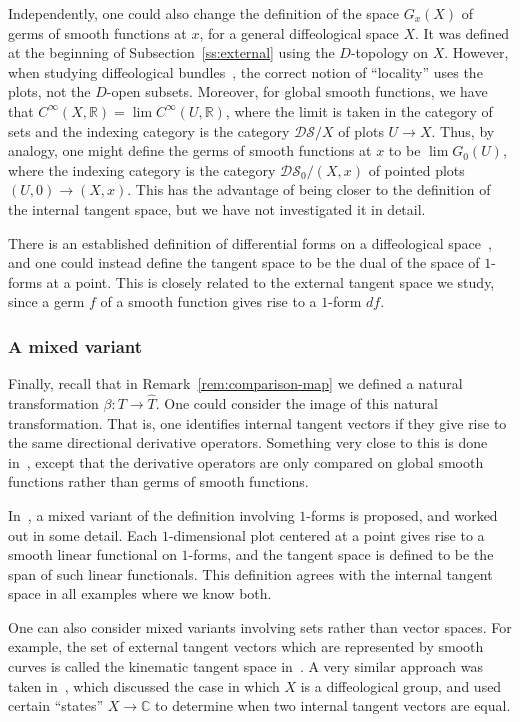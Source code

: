 \documentclass[12pt]{amsart}
\theoremstyle{remark}
\newcommand{\DS}{{\mathcal{DS}}}
\def \C{\mathbb{C}}
\def \R{\mathbb{R}}
\begin{document}
Independently, one could also change the definition of the space $G_x(X)$
of germs of smooth functions at $x$, for a general diffeological space $X$.
It was defined at the beginning of Subsection~\ref{ss:external} using the
$D$-topology on $X$.
However, when studying diffeological bundles~\cite{I1}, the correct notion
of ``locality'' uses the plots, not the $D$-open subsets.
Moreover, for global smooth functions, we have that
$C^{\infty}(X, \R) = \lim C^{\infty}(U, \R)$,
where the limit is taken in the category of sets and the indexing category
is the category $\DS/X$ of plots $U \to X$.
Thus, by analogy, one might define the germs of smooth functions at $x$ to be
$\lim G_0(U)$,
where the indexing category is the category $\DS_0/(X,x)$ of pointed plots
$(U,0) \to (X,x)$.
This has the advantage of being closer to the definition of the internal tangent
space, but we have not investigated it in detail.

There is an established definition of differential forms on a
diffeological space~\cite{I3}, and one could instead define the
tangent space to be the dual of the space of $1$-forms at a point.
This is closely related to the external tangent space we study,
since a germ $f$ of a smooth function gives rise to a $1$-form $df$.

\subsubsection{A mixed variant}

Finally, recall that in Remark~\ref{rem:comparison-map} we defined a
natural transformation $\beta : T \to \hat{T}$.
One could consider the image of this natural transformation.
That is, one identifies internal tangent vectors if they give rise
to the same directional derivative operators.
%
%
Something very close to this is done in~\cite{V}, except that
the derivative operators are only compared on global smooth functions
rather than germs of smooth functions.

In~\cite{I3}, a mixed variant of the definition involving
$1$-forms is proposed, and worked out in some detail.
Each $1$-dimensional plot centered at a point gives rise to a smooth
linear functional on $1$-forms, and the tangent space is defined to
be the span of such linear functionals.
This definition agrees with the internal tangent space in all examples
where we know both.

One can also consider mixed variants involving sets rather than
vector spaces.  For example, the set of external tangent
vectors which are represented by smooth curves is called the
kinematic tangent space in~\cite{St2}.
%
%
A very similar approach was taken in~\cite{So1}, which discussed
the case in which $X$ is a diffeological group, and used certain ``states''
$X \to \C$ to determine when two internal tangent vectors are equal.
\end{document}
